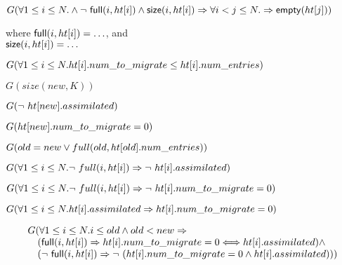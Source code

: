 \begin{lemma} %
 $G(\forall 1 \leq i \leq N.  \wedge \mbox{$\neg\ \mathsf{full}(i, \mbox{$ht[i]$})$}
  \wedge \mathsf{size}(i,\mbox{$ht[i]$}) \Rightarrow \forall i < j \leq N.
  \Rightarrow \mathsf{empty}(\mbox{$ht[j]$}))$

\noindent where $\mathsf{full}(i, \mbox{$ht[i]$})= \ldots$, and \\
$\mathsf{size}(i, \mbox{$ht[i]$})=\ldots$
  \label{lemma2a}
\end{lemma}

\begin{lemma} %
  $G(\forall 1 \leq i \leq N. \mbox{$ht[i]$}.num\_to\_migrate \leq \mbox{$ht[i]$}.num\_entries)$
    \label{lemma3}
\end{lemma}  

\begin{lemma} %
  $G(size(new,K))$
    \label{lemma4}
\end{lemma}  

\begin{lemma} %
  $G(\mbox{$\neg\ \mbox{$ht[new]$}.assimilated$})$
    \label{lemma5a}
\end{lemma}  

\begin{lemma} %
  $G(\mbox{$ht[new]$}.num\_to\_migrate = 0)$
    \label{lemma5b}
\end{lemma}  

\begin{lemma} %
  $G(old = new \vee full(old, \mbox{$ht[old]$}.num\_entries))$
    \label{lemma5c}
\end{lemma}  

\begin{lemma} %
  $G(\forall 1 \leq i \leq N. \mbox{$\neg\ full(i,\mbox{$ht[i]$})$} \Rightarrow \mbox{$\neg\ \mbox{$ht[i]$}.assimilated$})$
  \label{lemma5e}  
\end{lemma}  

\begin{lemma} %
  $G(\forall 1 \leq i \leq N. \mbox{$\neg\ full(i,\mbox{$ht[i]$})$} \Rightarrow \mbox{$\neg\ \mbox{$ht[i]$}.num\_to\_migrate = 0$})$
  \label{lemma5f}
\end{lemma}  

\begin{lemma} %
  $G(\forall 1 \leq i \leq N. \mbox{$ht[i]$}.assimilated \Rightarrow \mbox{$ht[i]$}.num\_to\_migrate = 0)$
  \label{lemma5g}  
\end{lemma}  

\begin{lemma} %
  \begin{equation*}
    \begin{array}{l}
    G(\forall 1 \leq i \leq N. i \leq old \wedge old < new \Rightarrow  \\
    \quad (\mathsf{full}(i, \mbox{$ht[i]$}) \Rightarrow \mbox{$ht[i]$}.num\_to\_migrate = 0 \Longleftrightarrow \mbox{$ht[i]$}.assimilated) \wedge \\
    \quad (\mbox{$\neg\ \mathsf{full}(i, \mbox{$ht[i]$})$} \Rightarrow \mbox{$\neg\ (\mbox{$ht[i]$}.num\_to\_migrate = 0 \wedge \mbox{$ht[i]$}.assimilated)$}))
    \end{array}
  \end{equation*}
  \label{lemma6}  
\end{lemma}  


